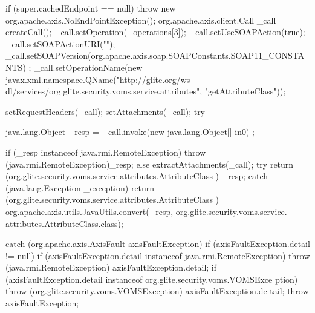 \begin{DoxyCode}
                                                                                 
                                                                                       
                        {
        if (super.cachedEndpoint == null) {
            throw new org.apache.axis.NoEndPointException();
        }
        org.apache.axis.client.Call _call = createCall();
        _call.setOperation(_operations[3]);
        _call.setUseSOAPAction(true);
        _call.setSOAPActionURI("");
        _call.setSOAPVersion(org.apache.axis.soap.SOAPConstants.SOAP11_CONSTANTS)
      ;
        _call.setOperationName(new javax.xml.namespace.QName("http://glite.org/ws
      dl/services/org.glite.security.voms.service.attributes", "getAttributeClass"));

        setRequestHeaders(_call);
        setAttachments(_call);
 try {        java.lang.Object _resp = _call.invoke(new java.lang.Object[] {in0})
      ;

        if (_resp instanceof java.rmi.RemoteException) {
            throw (java.rmi.RemoteException)_resp;
        }
        else {
            extractAttachments(_call);
            try {
                return (org.glite.security.voms.service.attributes.AttributeClass
      ) _resp;
            } catch (java.lang.Exception _exception) {
                return (org.glite.security.voms.service.attributes.AttributeClass
      ) org.apache.axis.utils.JavaUtils.convert(_resp, org.glite.security.voms.service.
      attributes.AttributeClass.class);
            }
        }
  } catch (org.apache.axis.AxisFault axisFaultException) {
    if (axisFaultException.detail != null) {
        if (axisFaultException.detail instanceof java.rmi.RemoteException) {
              throw (java.rmi.RemoteException) axisFaultException.detail;
         }
        if (axisFaultException.detail instanceof org.glite.security.voms.VOMSExce
      ption) {
              throw (org.glite.security.voms.VOMSException) axisFaultException.de
      tail;
         }
   }
  throw axisFaultException;
}
    }
\end{DoxyCode}
